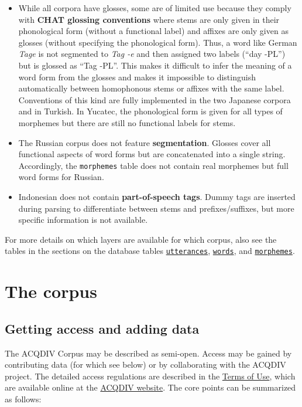 \documentclass[a4paper, 11pt]{book}
\begin{document}
\begin{itemize}
	\item While all corpora have glosses, some are of limited use because they comply with \textbf{CHAT glossing conventions} where stems are only given
		in their phonological form (without a functional label) and affixes are only given as glosses (without specifying the phonological form). 
		Thus, a word like German \emph{Tage} is not segmented to \emph{Tag -e} and then assigned two labels (“day -PL”) but is glossed as “Tag -PL”. 
		This makes it difficult to infer the meaning of a word form from the glosses and makes it impossible to distinguish automatically between 
		homophonous stems or affixes with the same label. Conventions of this kind are fully implemented in the two Japanese corpora and in Turkish. 
		In Yucatec, the phonological form is given for all types of morphemes but there are still no functional labels for stems. 
	\item The Russian corpus does not feature \textbf{segmentation}. Glosses cover all functional aspects of word forms but are concatenated into a
		single string. Accordingly, the \texttt{morphemes} table does not contain real morphemes but full word forms for Russian. 	 
	\item Indonesian does not contain \textbf{part-of-speech tags}. Dummy tags are inserted during parsing to differentiate between stems and prefixes/suffixes, 
		but more specific information is not available. 
\end{itemize}

For more details on which layers are available for which corpus, also see the tables in the sections on the database tables \hyperref[subsec:Table utterances]{\texttt{utterances}}, \hyperref[subsec:Table words]{\texttt{words}}, and \hyperref[subsec:Table morphemes]{\texttt{morphemes}}. 


\chapter{The corpus}
\label{cha:Details of the corpus}

\section{Getting access and adding data}
\label{sec:Access to the corpus}

The ACQDIV Corpus may be described as semi-open. Access may be gained by contributing data (for which see below) or by collaborating with the ACQDIV project. The detailed access regulations are described in the \href{http://www.acqdiv.uzh.ch/dam/jcr:c7318751-f531-43a8-9dbd-b48eee950a4c/terms_of_use_for_the_acqdiv_corpus.pdf}{Terms of Use}, which are available online at the \href{http://www.acqdiv.uzh.ch/en/resources.html}{ACQDIV website}. The core points can be summarized as follows: 
\end{document}
